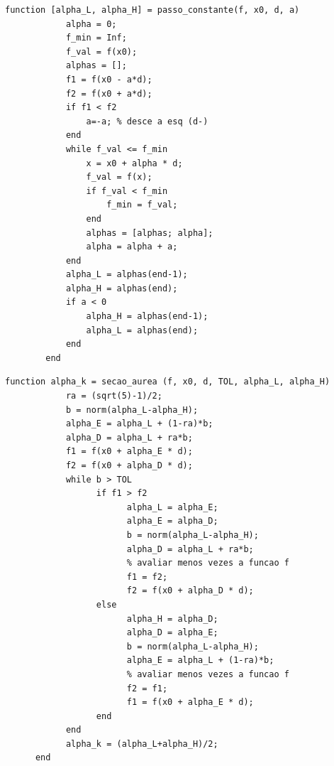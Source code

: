 \documentclass[10pt, a4paper]{article}
\begin{document}
\begin{minipage}{\linewidth}
      \begin{lstlisting}[style=myStyle, caption=script osr.m implementando o m\'etodo de Powell, label=list_passo_constante]
            function [alpha_L, alpha_H] = passo_constante(f, x0, d, a)
            alpha = 0;
            f_min = Inf;
            f_val = f(x0);
            alphas = [];
            f1 = f(x0 - a*d);
            f2 = f(x0 + a*d);
            if f1 < f2
                a=-a; % desce a esq (d-)
            end
            while f_val <= f_min
                x = x0 + alpha * d;
                f_val = f(x);
                if f_val < f_min
                    f_min = f_val;
                end
                alphas = [alphas; alpha];
                alpha = alpha + a;
            end
            alpha_L = alphas(end-1);
            alpha_H = alphas(end);
            if a < 0
                alpha_H = alphas(end-1);
                alpha_L = alphas(end);
            end
        end
      \end{lstlisting}
\end{minipage}

\begin{minipage}{\linewidth}
      \begin{lstlisting}[style=myStyle, caption=script osr.m implementando o m\'etodo de Powell, label=list_secao_aurea]
      function alpha_k = secao_aurea (f, x0, d, TOL, alpha_L, alpha_H)
            ra = (sqrt(5)-1)/2;
            b = norm(alpha_L-alpha_H);
            alpha_E = alpha_L + (1-ra)*b;
            alpha_D = alpha_L + ra*b;
            f1 = f(x0 + alpha_E * d);
            f2 = f(x0 + alpha_D * d);
            while b > TOL
                  if f1 > f2
                        alpha_L = alpha_E;
                        alpha_E = alpha_D;
                        b = norm(alpha_L-alpha_H);
                        alpha_D = alpha_L + ra*b;
                        % avaliar menos vezes a funcao f
                        f1 = f2;
                        f2 = f(x0 + alpha_D * d);
                  else
                        alpha_H = alpha_D;
                        alpha_D = alpha_E;
                        b = norm(alpha_L-alpha_H);
                        alpha_E = alpha_L + (1-ra)*b;
                        % avaliar menos vezes a funcao f
                        f2 = f1;
                        f1 = f(x0 + alpha_E * d);
                  end
            end
            alpha_k = (alpha_L+alpha_H)/2;
      end
      \end{lstlisting}
\end{minipage}
\end{document}
